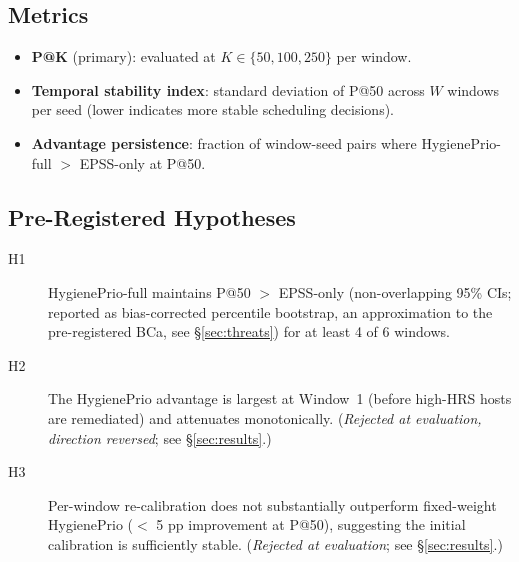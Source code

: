 \subsection{Metrics}

\begin{itemize}
\item \textbf{P@K} (primary): evaluated at $K \in \{50, 100, 250\}$ per window.
\item \textbf{Temporal stability index}: standard deviation of P@50 across $W$ windows per seed (lower indicates more stable scheduling decisions).
\item \textbf{Advantage persistence}: fraction of window-seed pairs where HygienePrio-full $>$ EPSS-only at P@50.
\end{itemize}

\subsection{Pre-Registered Hypotheses}

\begin{description}
\item[H1] HygienePrio-full maintains P@50 $>$ EPSS-only (non-overlapping 95\% CIs; reported as bias-corrected percentile bootstrap, an approximation to the pre-registered BCa, see \S\ref{sec:threats}) for at least 4 of 6 windows.
\item[H2] The HygienePrio advantage is largest at Window~1 (before high-HRS hosts are remediated) and attenuates monotonically. (\textit{Rejected at evaluation, direction reversed}; see \S\ref{sec:results}.)
\item[H3] Per-window re-calibration does not substantially outperform fixed-weight HygienePrio ($<$ 5 pp improvement at P@50), suggesting the initial calibration is sufficiently stable. (\textit{Rejected at evaluation}; see \S\ref{sec:results}.)
\end{description}
